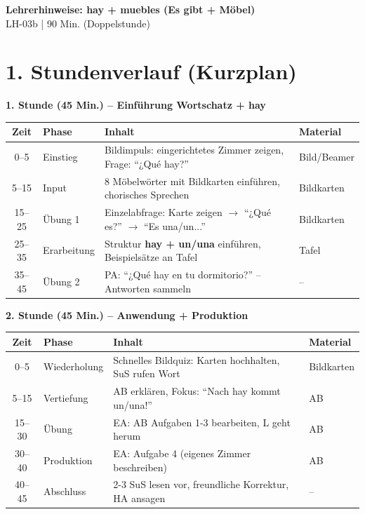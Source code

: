 \documentclass[11pt, a4paper]{article}
\newcommand{\fachfarbe}{spanisch}
\newcommand{\thema}{hay + muebles (Es gibt + Möbel)}
\newcommand{\sequenz}{03}
\newcommand{\block}{b}
\newcommand{\dauer}{90 Min. (Doppelstunde)}
\newcommand{\es}[1]{\textcolor{\fachfarbe}{\textbf{#1}}}
\begin{document}

\begin{center}
    {\Large\bfseries\textcolor{\fachfarbe}{Lehrerhinweise: \thema}}\\[0.3em]
    {\normalsize LH-\sequenz\block{} | \dauer}
\end{center}

\vspace{10pt}


\section*{1. Stundenverlauf (Kurzplan)}

\textbf{1. Stunde (45 Min.) -- Einführung Wortschatz + hay}

\begin{tabularx}{\textwidth}{|c|l|X|l|}
\hline
\textbf{Zeit} & \textbf{Phase} & \textbf{Inhalt} & \textbf{Material} \\
\hline
0--5 & Einstieg & Bildimpuls: eingerichtetes Zimmer zeigen, Frage: ``¿Qué hay?'' & Bild/Beamer \\
\hline
5--15 & Input & 8 Möbelwörter mit Bildkarten einführen, chorisches Sprechen & Bildkarten \\
\hline
15--25 & Übung 1 & Einzelabfrage: Karte zeigen $\rightarrow$ ``¿Qué es?'' $\rightarrow$ ``Es una/un...'' & Bildkarten \\
\hline
25--35 & Erarbeitung & Struktur \es{hay + un/una} einführen, Beispielsätze an Tafel & Tafel \\
\hline
35--45 & Übung 2 & PA: ``¿Qué hay en tu dormitorio?'' -- Antworten sammeln & -- \\
\hline
\end{tabularx}

\vspace{1em}

\textbf{2. Stunde (45 Min.) -- Anwendung + Produktion}

\begin{tabularx}{\textwidth}{|c|l|X|l|}
\hline
\textbf{Zeit} & \textbf{Phase} & \textbf{Inhalt} & \textbf{Material} \\
\hline
0--5 & Wiederholung & Schnelles Bildquiz: Karten hochhalten, SuS rufen Wort & Bildkarten \\
\hline
5--15 & Vertiefung & AB erklären, Fokus: ``Nach hay kommt un/una!'' & AB \\
\hline
15--30 & Übung & EA: AB Aufgaben 1-3 bearbeiten, L geht herum & AB \\
\hline
30--40 & Produktion & EA: Aufgabe 4 (eigenes Zimmer beschreiben) & AB \\
\hline
40--45 & Abschluss & 2-3 SuS lesen vor, freundliche Korrektur, HA ansagen & -- \\
\hline
\end{tabularx}
\end{document}
